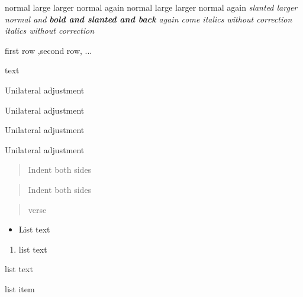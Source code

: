 \documentclass[12pt,twoside,a4paper]{article}   %
\begin{document}
	normal {\large large \Large larger} normal again
	normal large larger normal again
	\sl slanted {\Large larger}
	\setlength{\baselineskip}{15pt}
	\renewcommand{\baselinestretch}{1.5} %
	normal and \textbf{bold and \textsl{slanted} and back} again
	\textit {come italics\nocorr} without correction {\slshape italics \nocorr\textup{without} correction}
	   
	{\tt{}}
	\newpage
	\begin{center}
	 first row ,second row, ...
	\end{center}
	\centering
	\centerline{text}
	\begin{flushleft}
		Unilateral adjustment
	\end{flushleft}
	\begin{flushright}
		Unilateral adjustment
	\end{flushright}
	\raggedleft Unilateral adjustment\\
	\raggedright Unilateral adjustment\\
	\begin{quote}
		Indent both sides
	\end{quote}
	\begin{quotation}
		Indent both sides
	\end{quotation}
	\begin{verse}
		verse
	\end{verse}
	\begin{itemize}	
		\item List text
	\end{itemize}
	\begin{enumerate}
		\item list text
	\end{enumerate}
	\begin{description}
		\item list text
	\end{description}
	\begin{list}{标准标签}{列表声明}
		\item list item %
	\end{list}
\end{document}
